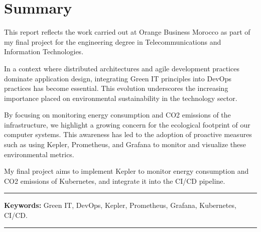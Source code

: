 \chapter*{Summary}

This report reflects the work carried out at Orange Business Morocco as part of my final project for the engineering degree in Telecommunications and Information Technologies.

In a context where distributed architectures and agile development practices dominate application design, integrating Green IT principles into DevOps practices has become essential. This evolution underscores the increasing importance placed on environmental sustainability in the technology sector.

By focusing on monitoring energy consumption and CO2 emissions of the infrastructure, we highlight a growing concern for the ecological footprint of our computer systems. This awareness has led to the adoption of proactive measures such as using Kepler, Prometheus, and Grafana to monitor and visualize these environmental metrics.

My final project aims to implement Kepler to monitor energy consumption and CO2 emissions of Kubernetes, and integrate it into the CI/CD pipeline.

\noindent\rule[2pt]{\textwidth}{0.5pt}

{\textbf{Keywords:}}
Green IT, DevOps, Kepler, Prometheus, Grafana, Kubernetes, CI/CD. 

\noindent\rule[2pt]{\textwidth}{0.5pt}